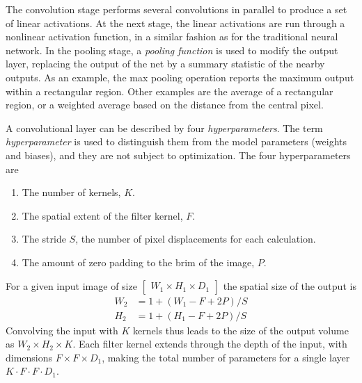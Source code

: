 The convolution stage performs several convolutions in parallel to produce a set of linear activations. At the next stage, the linear activations are run through a nonlinear activation function, in a similar fashion as for the traditional neural network. In the pooling stage, a \textit{pooling function} is used to modify the output layer, replacing the output of the net by a summary statistic of the nearby outputs. As an example, the max pooling operation reports the maximum output within a rectangular region. Other examples are the average of a rectangular region, or a weighted average based on the distance from the central pixel.

A convolutional layer can be described by four \textit{hyperparameters}. The term \textit{hyperparameter} is used to distinguish them from the model parameters (weights and biases), and they are not subject to optimization. The four hyperparameters are
\begin{enumerate}
	\item The number of kernels, $K$.
	\item The spatial extent of the filter kernel, $F$.
	\item The stride $S$, the number of pixel displacements for each calculation.
	\item The amount of zero padding to the brim of the image, $P$.
\end{enumerate}
For a given input image of size $\begin{bmatrix}
W_1\times H_1\times D_1
\end{bmatrix}$ the spatial size of the output is 
\begin{equation}
\begin{split}
W_2&=1+(W_1-F+2P)/S\\
H_2&=1+(H_1-F+2P)/S
\end{split}
\end{equation}
Convolving the input with $K$ kernels thus leads to the size of the output volume as $
W_2\times H_2\times K$. Each filter kernel extends through the depth of the input, with dimensions $F\times F\times D_1$, making the total number of parameters for a single layer $K\cdot F\cdot F\cdot D_1$.
